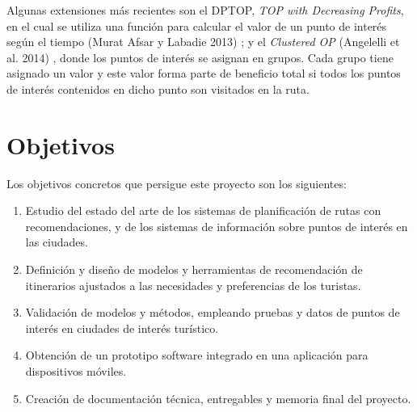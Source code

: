 Algunas extensiones más recientes son el DPTOP, \textit{TOP with Decreasing Profits}, en el cual se utiliza una función para calcular el valor de un punto de interés según el tiempo (Murat Afsar y Labadie 2013) \cite{dptop}; y el \textit{Clustered OP} (Angelelli et al. 2014) \cite{clustered_op}, donde los puntos de interés se asignan en grupos. Cada grupo tiene asignado un valor y este valor forma parte de beneficio total si todos los puntos de interés contenidos en dicho punto son visitados en la ruta.
\section[Objectivos]{Objetivos}
Los objetivos concretos que persigue este proyecto son los siguientes:
\begin{enumerate}
	\item Estudio del estado del arte de los sistemas de planificación de rutas con recomendaciones, y de los sistemas de información sobre puntos de interés en las ciudades.
	\item Definición y diseño de modelos y herramientas de recomendación de itinerarios ajustados a las necesidades y preferencias de los turistas.
	\item Validación de modelos y métodos, empleando pruebas y datos de puntos de interés en ciudades de interés turístico.
	\item Obtención de un prototipo software integrado en una aplicación para dispositivos móviles.
	\item Creación de documentación técnica, entregables y memoria final del proyecto.
\end{enumerate}
	
	

